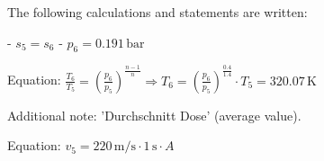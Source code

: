 The following calculations and statements are written:  

- \( s_5 = s_6 \)  
- \( p_6 = 0.191 \, \text{bar} \)  

Equation:  
\( \frac{T_6}{T_5} = \left( \frac{p_6}{p_5} \right)^{\frac{n-1}{n}} \Rightarrow T_6 = \left( \frac{p_6}{p_5} \right)^{\frac{0.4}{1.4}} \cdot T_5 = 320.07 \, \text{K} \)  

Additional note: 'Durchschnitt Dose' (average value).  

Equation:  
\( v_5 = 220 \, \text{m/s} \cdot 1 \, \text{s} \cdot A \)